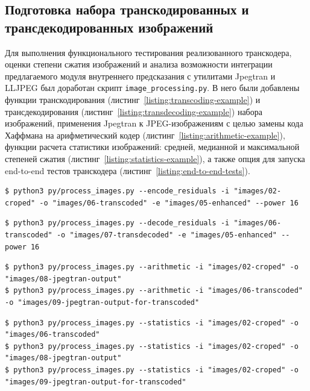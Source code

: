 \documentclass[times,specification,annotation]{itmo-student-thesis}
\begin{document}
\subsection{Подготовка набора транскодированных и трансдекодированных изображений}\label{subsection:testing}

Для выполнения функционального тестирования реализованного транскодера, оценки степени сжатия изображений и анализа возможности интеграции предлагаемого модуля внутреннего предсказания с утилитами Jpegtran и LLJPEG был доработан скрипт \texttt{image\_processing.py}. В него были добавлены функции транскодирования (листинг~\ref{listing:transcoding-example}) и трансдекодирования (листинг~\ref{listing:transdecoding-example}) набора изображений, применения Jpegtran к JPEG-изображениям с целью замены кода Хаффмана на арифметический кодер (листинг~\ref{listing:arithmetic-example}), функции расчета статистики изображений: средней, медианной и максимальной степеней сжатия (листинг~\ref{listing:statistics-example}), а также опция для запуска end-to-end тестов транскодера (листинг~\ref{listing:end-to-end-tests}).

\begin{lstlisting}[float=!h,caption={Пример транскодирования набора изображений},label={listing:transcoding-example}]
$ python3 py/process_images.py --encode_residuals -i "images/02-croped" -o "images/06-transcoded" -e "images/05-enhanced" --power 16
\end{lstlisting}

\begin{lstlisting}[float=!h,caption={Пример трансдекодирования набора изображений},label={listing:transdecoding-example}]
$ python3 py/process_images.py --decode_residuals -i "images/06-transcoded" -o "images/07-transdecoded" -e "images/05-enhanced" --power 16
\end{lstlisting}

\begin{lstlisting}[float=!h,caption={Пример транскодирования набора изображений, основанного на замене кода Хаффмана на арифметический кодер},label={listing:arithmetic-example}]
$ python3 py/process_images.py --arithmetic -i "images/02-croped" -o "images/08-jpegtran-output"
$ python3 py/process_images.py --arithmetic -i "images/06-transcoded" -o "images/09-jpegtran-output-for-transcoded"
\end{lstlisting}

\begin{lstlisting}[float=!h,caption={Пример рассчета статистики сжатия изображений},label={listing:statistics-example}]
$ python3 py/process_images.py --statistics -i "images/02-croped" -o "images/06-transcoded"
$ python3 py/process_images.py --statistics -i "images/02-croped" -o "images/08-jpegtran-output"
$ python3 py/process_images.py --statistics -i "images/02-croped" -o "images/09-jpegtran-output-for-transcoded"
\end{lstlisting}
\end{document}
